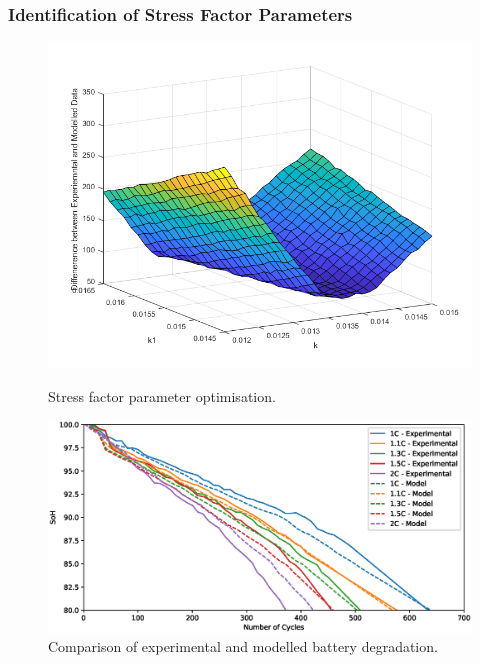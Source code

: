 \documentclass[a4paper, 10pt]{article}
\numberwithin{equation}{section}
\begin{document}
\subsubsection{Identification of Stress Factor Parameters}
\begin{figure}[h]
\centering
\begin{minipage}{.5\textwidth}
  \centering
    \includegraphics[width=0.95\linewidth]{images/ks.png}
    \caption{Stress factor parameter optimisation.}
    \label{fig:ks}
\end{minipage}%
\begin{minipage}{.5\textwidth}
  \centering
    \includegraphics[width=0.95\linewidth]{images/F2_SoH_expVmodel.eps}
    \caption{Comparison of experimental and modelled battery degradation.}
    \label{fig:SoH}
\end{minipage}
\end{figure}
\end{document}
